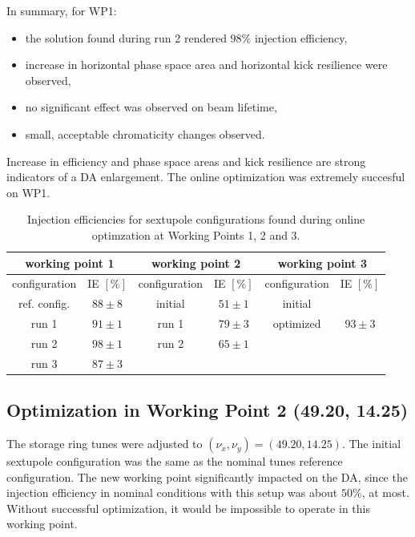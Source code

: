 In summary, for WP1:
\begin{itemize}
    \item the solution found during run 2 rendered $98\%$ injection efficiency,
    \item increase in horizontal phase space area and horizontal kick resilience were observed,
    \item no significant effect was observed on beam lifetime,
    \item small, acceptable chromaticity changes observed.
\end{itemize}
Increase in efficiency and phase space areas and kick resilience are strong indicators of a DA enlargement. The online optimization was extremely succesful on WP1.

\begin{table}[tb]
    \caption{Injection efficiencies for sextupole configurations found during online optimzation at Working Points 1, 2 and 3.}
    \centering
    \begin{tabular}{cccccc}
    \hline
    \multicolumn{2}{c}{working point 1} & \multicolumn{2}{c}{working point 2}         & \multicolumn{2}{c}{working point 3}         \\ \hline
    configuration      & IE $[\%]$      & configuration        & IE $[\%]$            & configuration        & IE $[\%]$            \\ \hline
    ref. config.       & $88\pm8$       & initial              & $51\pm1$             & initial              &                      \\
    run 1              & $91\pm1$       & run 1                & $79\pm3$             & optimized            & $93\pm3$             \\
    run 2              & $98\pm1$       & run 2                & $65\pm1    $         &                      &                      \\
    run 3              & $87\pm3$       & \multicolumn{1}{l}{} & \multicolumn{1}{l}{} & \multicolumn{1}{l}{} & \multicolumn{1}{l}{} \\ \hline
    \end{tabular}
    \label{table1}
    \end{table}

\subsection{Optimization in Working Point 2 (49.20, 14.25)}
The storage ring tunes were adjusted to $(\nu_x, \nu_y)=(49.20, 14.25)$. The initial sextupole configuration was the same as the nominal tunes reference configuration. The new working point significantly impacted on the DA, since the injection efficiency in nominal conditions with this setup was about $50\%$, at most. Without successful optimization, it would be impossible to operate in this working point.


